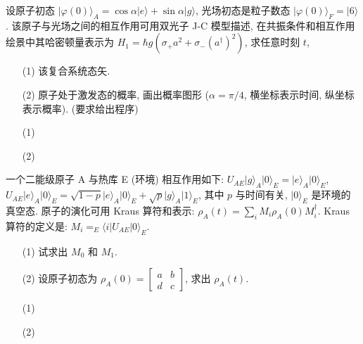 \documentclass{assignment}
\begin{document}
\begin{prob}
    设原子初态 $\lvert\varphi(0)\rangle_A=\cos\alpha\lvert e\rangle+\sin\alpha\lvert g\rangle$, 光场初态是粒子数态 $\lvert\varphi(0)\rangle_F=\lvert 6\rangle$. 该原子与光场之间的相互作用可用双光子 J-C 模型描述, 在共振条件和相互作用绘景中其哈密顿量表示为 $H_1=\hbar g(\sigma_+a^2+\sigma_-(a^{\dagger})^2)$, 求任意时刻 $t$,
    \begin{itemize}
        \item[(1)] 该复合系统态矢.
        \item[(2)] 原子处于激发态的概率, 画出概率图形 ($\alpha=\pi/4$, 横坐标表示时间, 纵坐标表示概率). (要求给出程序)
    \end{itemize}
\end{prob}
\begin{sol}
    \begin{itemize}
        \item[(1)] 
        \item[(2)] 
    \end{itemize}
\end{sol}

\begin{prob}
    一个二能级原子 A 与热库 E (环境) 相互作用如下: $U_{AE}\lvert g\rangle_A\lvert 0\rangle_E=\lvert e\rangle_A\lvert 0\rangle_E$, $U_{AE}\lvert e\rangle_A\lvert 0\rangle_E=\sqrt{1-p}\lvert e\rangle_A\lvert 0\rangle_E+\sqrt{p}\lvert g\rangle_A\lvert 1\rangle_E$, 其中 $p$ 与时间有关, $\lvert 0\rangle_E$ 是环境的真空态. 原子的演化可用 Kraus 算符和表示: $\rho_A(t)=\sum_iM_i\rho_A(0)M_i^{\dagger}$. Kraus 算符的定义是: $M_i=_E\langle i\rvert U_{AE}\lvert 0\rangle_E$.
    \begin{itemize}
        \item[(1)] 试求出 $M_0$ 和 $M_1$.
        \item[(2)] 设原子初态为 $\rho_A(0)=\begin{bmatrix}
            a&b\\
            d&c
        \end{bmatrix}$, 求出 $\rho_A(t)$.
    \end{itemize}
\end{prob}
\begin{sol}
    \begin{itemize}
        \item[(1)] 
        \item[(2)] 
    \end{itemize}
\end{sol}
\end{document}
